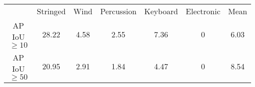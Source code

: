 \begin{tabular}{c|c|c|c|c|c||c}\hline
		& Stringed & Wind & Percussion & Keyboard & Electronic & Mean\\ 
	AP IoU $\geq10$ & 28.22         & 4.58      & 2.55           & 7.36  & 0   &  6.03  \\
	AP IoU $\geq50$ & 20.95         &  2.91    &  1.84          &  4.47       & 0 & 8.54 
\end{tabular}
